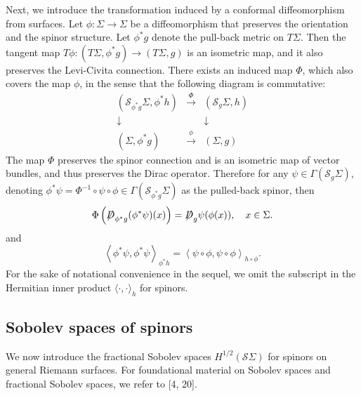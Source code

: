 \documentclass[a4paper, 12pt]{article}
\def\slashiii#1{\setbox0=\hbox{$#1$}#1\hskip-\wd0\hbox to\wd0{\hss\sl/\/\hss}}
\begin{document}
Next, we introduce the transformation induced by a conformal diffeomorphism from surfaces. Let \(\phi:\Sigma\to\Sigma\) be a diffeomorphism that preserves the orientation and the spinor structure. Let \(\phi^{*}g\) denote the pull-back metric on \(T\Sigma\). Then the tangent map \(T\phi:(T\Sigma,\phi^{*}g)\to(T\Sigma,g)\) is an isometric map, and it also preserves the Levi-Civita connection. There exists an induced map \(\Phi\), which also covers the map \(\phi\), in the sense that the following diagram is commutative:
\[\begin{array}{*{20}{c}}
	{({\mathcal{S} _{{{\phi}^*g}}}\Sigma,{\phi}^*h)}&{\xrightarrow{\Phi }}&{({\mathcal{S} _g}\Sigma,{h})} \\
	\downarrow &{}& \downarrow  \\
	{(\Sigma,{{\phi}^*g})}&{\xrightarrow{{\phi}}}&{(\Sigma,g)}
\end{array}\]
The map \(\Phi\) preserves the spinor connection and is an isometric map of vector bundles, and thus preserves the Dirac operator. Therefore for any \(\psi\in\Gamma(\mathcal{S}_g\Sigma)\), denoting \(\phi^{*}\psi=\Phi^{-1}\circ\psi\circ\phi\in\Gamma(\mathcal{S}_{\phi^{*}g}\Sigma)\) as the pulled-back spinor, then
\begin{equation}\label{2.22}
	\Phi\left(\slashiii{D}_{\phi^{*}g}(\phi^{*}\psi)(x)\right)=\slashiii{D}_g\psi(\phi(x)),\quad x\in\Sigma.
\end{equation}
and
\begin{equation}\label{2.23}
	{\left\langle {{\phi ^*}\psi ,{\phi ^*}\psi } \right\rangle _{\phi^*h}} = {\left\langle {\psi \circ \phi ,\psi \circ \phi } \right\rangle _{h\circ \phi }}.
\end{equation}
For the sake of notational convenience in the sequel, we omit the subscript in the Hermitian inner product \( \langle \cdot, \cdot \rangle _h\) for spinors.
\subsection{Sobolev spaces of spinors}\label{Sobolev-spin}
We now introduce the fractional Sobolev spaces \( H^{1/2}(\mathcal{S}\Sigma) \) for spinors on general Riemann surfaces. For foundational material on Sobolev spaces and fractional Sobolev spaces, we refer to [4, 20].
\end{document}
